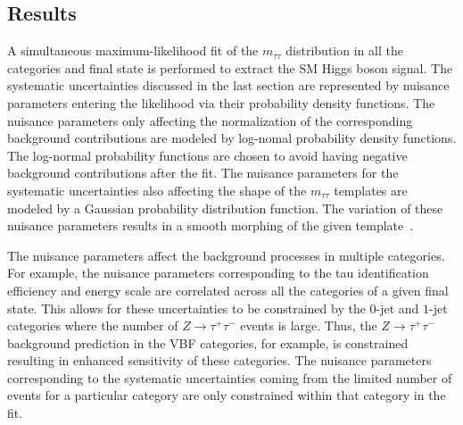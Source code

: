 \subsection{Results}

A simultaneous maximum-likelihood fit of the $m_{\tau\tau}$ distribution in all the categories and final state is performed to extract the SM Higgs boson signal. The systematic uncertainties discussed in the last section are represented by nuisance parameters entering the likelihood via their probability density functions. The nuisance parameters only affecting the normalization of the corresponding background contributions are modeled by log-nomal  probability density functions. The log-normal probability functions are chosen to avoid having negative background contributions after the fit. The nuisance parameters for the systematic uncertainties also affecting the shape of the $m_{\tau\tau}$ templates are modeled by a Gaussian probability distribution function. The variation of these nuisance parameters results in a smooth morphing of the given template~\cite{Conway-PhyStat}. 

The nuisance parameters affect the background processes in multiple categories. For example, the nuisance parameters corresponding to the tau identification efficiency and energy scale  are correlated across all the categories of a given final state. This allows for these uncertainties to be constrained by the $0$-jet and $1$-jet categories where the number of $Z\rightarrow\tau^{+}\tau^{-}$ events is large. Thus, the $Z\rightarrow\tau^{+}\tau^{-}$ background prediction in the VBF categories, for example, is constrained resulting in enhanced sensitivity of these categories. The nuisance parameters corresponding to the systematic uncertainties coming from the limited number of events for a particular category are only constrained within that category in the fit. 

